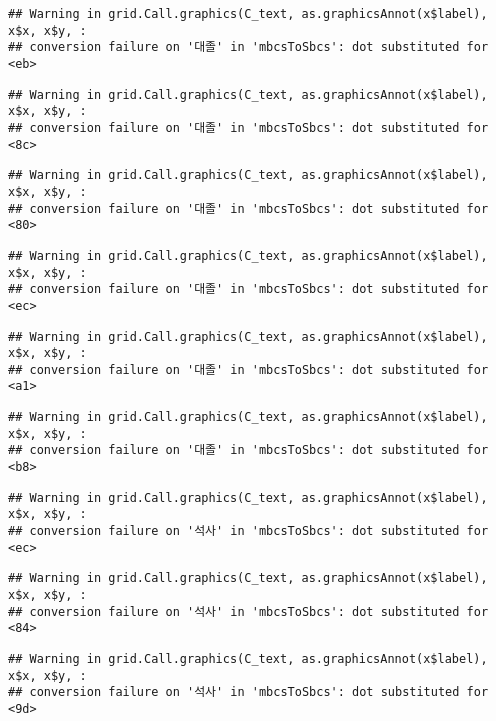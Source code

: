 \documentclass[
]{article}
\begin{document}
\begin{verbatim}
## Warning in grid.Call.graphics(C_text, as.graphicsAnnot(x$label), x$x, x$y, :
## conversion failure on '대졸' in 'mbcsToSbcs': dot substituted for <eb>
\end{verbatim}

\begin{verbatim}
## Warning in grid.Call.graphics(C_text, as.graphicsAnnot(x$label), x$x, x$y, :
## conversion failure on '대졸' in 'mbcsToSbcs': dot substituted for <8c>
\end{verbatim}

\begin{verbatim}
## Warning in grid.Call.graphics(C_text, as.graphicsAnnot(x$label), x$x, x$y, :
## conversion failure on '대졸' in 'mbcsToSbcs': dot substituted for <80>
\end{verbatim}

\begin{verbatim}
## Warning in grid.Call.graphics(C_text, as.graphicsAnnot(x$label), x$x, x$y, :
## conversion failure on '대졸' in 'mbcsToSbcs': dot substituted for <ec>
\end{verbatim}

\begin{verbatim}
## Warning in grid.Call.graphics(C_text, as.graphicsAnnot(x$label), x$x, x$y, :
## conversion failure on '대졸' in 'mbcsToSbcs': dot substituted for <a1>
\end{verbatim}

\begin{verbatim}
## Warning in grid.Call.graphics(C_text, as.graphicsAnnot(x$label), x$x, x$y, :
## conversion failure on '대졸' in 'mbcsToSbcs': dot substituted for <b8>
\end{verbatim}

\begin{verbatim}
## Warning in grid.Call.graphics(C_text, as.graphicsAnnot(x$label), x$x, x$y, :
## conversion failure on '석사' in 'mbcsToSbcs': dot substituted for <ec>
\end{verbatim}

\begin{verbatim}
## Warning in grid.Call.graphics(C_text, as.graphicsAnnot(x$label), x$x, x$y, :
## conversion failure on '석사' in 'mbcsToSbcs': dot substituted for <84>
\end{verbatim}

\begin{verbatim}
## Warning in grid.Call.graphics(C_text, as.graphicsAnnot(x$label), x$x, x$y, :
## conversion failure on '석사' in 'mbcsToSbcs': dot substituted for <9d>
\end{verbatim}
\end{document}
